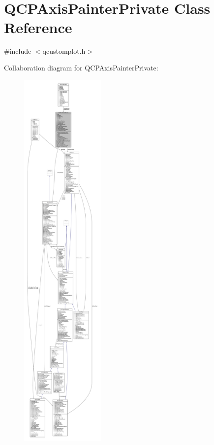 \hypertarget{class_q_c_p_axis_painter_private}{}\section{Q\+C\+P\+Axis\+Painter\+Private Class Reference}
\label{class_q_c_p_axis_painter_private}


{\ttfamily \#include $<$qcustomplot.\+h$>$}



Collaboration diagram for Q\+C\+P\+Axis\+Painter\+Private\+:\nopagebreak
\begin{figure}[H]
\begin{center}
\leavevmode
\includegraphics[height=550pt]{class_q_c_p_axis_painter_private__coll__graph}
\end{center}
\end{figure}
